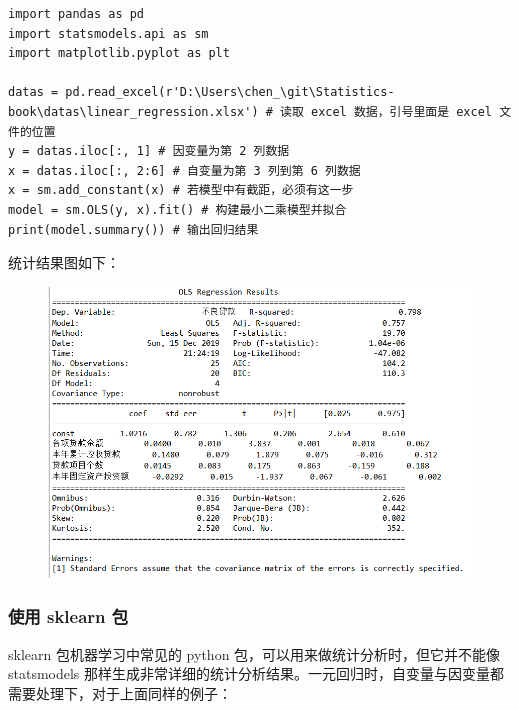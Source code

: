 \begin{lstlisting}[Language=Python]
import pandas as pd
import statsmodels.api as sm
import matplotlib.pyplot as plt

datas = pd.read_excel(r'D:\Users\chen_\git\Statistics-book\datas\linear_regression.xlsx') # 读取 excel 数据，引号里面是 excel 文件的位置
y = datas.iloc[:, 1] # 因变量为第 2 列数据
x = datas.iloc[:, 2:6] # 自变量为第 3 列到第 6 列数据
x = sm.add_constant(x) # 若模型中有截距，必须有这一步
model = sm.OLS(y, x).fit() # 构建最小二乘模型并拟合
print(model.summary()) # 输出回归结果
\end{lstlisting}

统计结果图如下：

\begin{figure}[ht]
  \centering
  \includegraphics[scale=0.8]{figure/linearRegressionResult2.png}
\end{figure}




\subsubsection{使用 sklearn 包}

sklearn 包机器学习中常见的 python 包，可以用来做统计分析时，但它并不能像 statsmodels 那样生成非常详细的统计分析结果。一元回归时，自变量与因变量都需要处理下，对于上面同样的例子：

